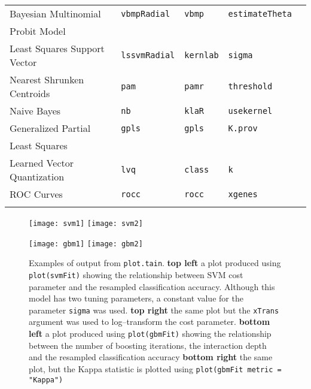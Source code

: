 \documentclass[12pt]{article}
\begin{document}
\begin{longtable}{lllll}
      Bayesian Multinomial  
      & \texttt{vbmpRadial} 
      & \texttt{vbmp} 
      & \texttt{estimateTheta} \\
      \:\: Probit Model \\
      
      Least Squares Support Vector  &
         \texttt{lssvmRadial} & 
            \texttt{kernlab}       & 
            \texttt{sigma} \\             
                  
      Nearest Shrunken Centroids &
         \texttt{pam} & 
            \texttt{pamr}       & 
            \texttt{threshold} \\  
                                                                   
      Naive Bayes &
         \texttt{nb} & 
            \texttt{klaR}       & 
            \texttt{usekernel} \\
        
      Generalized Partial &
         \texttt{gpls} & 
            \texttt{gpls}       & 
            \texttt{K.prov} \\
      \:\: Least Squares \\
      
      Learned Vector Quantization &
         \texttt{lvq} & 
            \texttt{class}       &          
            \texttt{k} \\       
      ROC Curves &
         \texttt{rocc} & 
            \texttt{rocc}       &          
            \texttt{xgenes} \\                 
\label{label-name}
\end{longtable}

\begin{figure}[p]
   \begin{center}		
      \texttt{[image: svm1]}
      \hspace*{.4 in}   
      \texttt{[image: svm2]}
      
      \vspace*{.5 in}   
      
      \texttt{[image: gbm1]}
      \hspace*{.4 in}
      \texttt{[image: gbm2]}    

      \caption{ Examples of output from \texttt{plot.tain}. {\bf top left} a plot produced using \texttt{plot(svmFit)} showing the relationship between SVM cost parameter and the resampled classification accuracy. Although this model has two tuning parameters, a constant value for the parameter \texttt{sigma} was used. {\bf top right} the same plot but the \texttt{xTrans} argument was used to log--transform the cost parameter. {\bf bottom left} a plot produced using \texttt{plot(gbmFit)} showing the relationship between the number of boosting iterations, the interaction depth and the resampled classification accuracy {\bf bottom right} the same plot, but the Kappa statistic is plotted using \texttt{plot(gbmFit metric = "Kappa")}}
      \label{f:plots1} 
    \end{center}
\end{figure} 
	   
\end{document}
